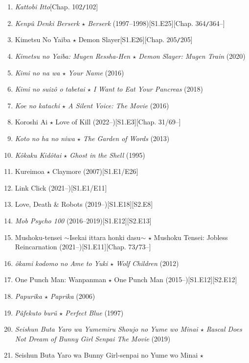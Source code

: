 \documentclass{article}
\begin{document}
\begin{enumerate}
    $\star$ Kaguya-sama: Love is War (2019--)\hfill[S1.E12][S2.E12][S3.E1]
    \item \textit{Kattobi Itto}\hfill[Chap. 102\texttt{/}102]
    \item \textit{Kenp\^u Denki Berserk $\star$ Berserk} (1997--1998)\hfill[S1.E25][Chap. 364\texttt{/}364--]
    \item Kimetsu No Yaiba $\star$ Demon Slayer\hfill[S1.E26][Chap. 205\texttt{/}205]
    \item \textit{Kimetsu no Yaiba: Mugen Ressha-Hen $\star$ Demon Slayer: Mugen Train} (2020)
    \item \textit{Kimi no na wa $\star$ Your Name} (2016)
    \item \textit{Kimi no suiz\^o o tabetai $\star$ I Want to Eat Your Pancreas} (2018)
    \item \textit{Koe no katachi $\star$ A Silent Voice: The Movie} (2016)
    \item Koroshi Ai $\star$ Love of Kill (2022--)\hfill[S1.E3][Chap. 31/69--]
    \item \textit{Koto no ha no niwa $\star$ The Garden of Words} (2013)
    \item \textit{K\^okaku Kid\^otai $\star$ Ghost in the Shell} (1995)
    \item Kureimoa $\star$ Claymore (2007)\hfill[S1.E1/E26]
    \item Link Click (2021--)\hfill[S1.E1/E11]
    \item Love, Death \& Robots (2019--)\hfill[S1.E18][S2.E8]
    \item \textit{Mob Psycho 100} (2016--2019)\hfill[S1.E12][S2.E13]
    \item Mushoku-tensei $\sim$Isekai ittara honki dasu$\sim$ $\star$ Mushoku Tensei: Jobless Reincarnation (2021--)\hfill[S1.E11][Chap. 73\texttt{/}73--]
    \item \textit{\^okami kodomo no Ame to Yuki $\star$ Wolf Children} (2012)
    \item One Punch Man: Wanpanman $\star$ One Punch Man (2015--)\hfill[S1.E12][S2.E12]
    \item \textit{Papurika $\star$ Paprika} (2006)
    \item \textit{Pâfekuto burû $\star$ Perfect Blue} (1997)
    \item \textit{Seishun Buta Yaro wa Yumemiru Shoujo no Yume wo Minai $\star$ Rascal Does Not Dream of Bunny Girl Senpai The Movie} (2019)
    \item Seishun Buta Yaro wa Bunny Girl-senpai no Yume wo Minai $\star$
    

\end{enumerate}
\end{document}
